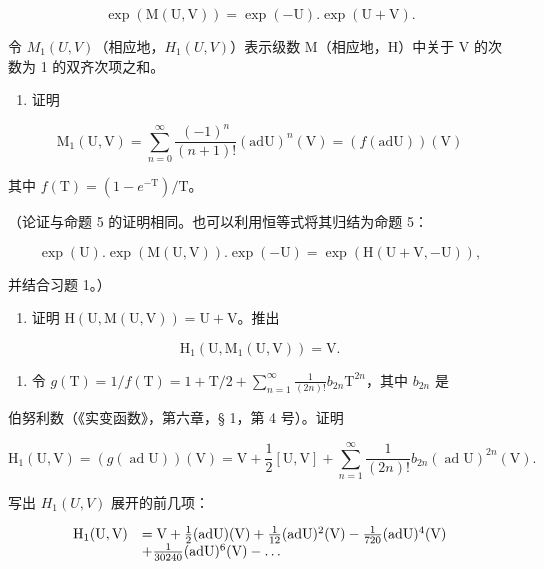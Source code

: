 \[
\exp (\mathrm{M} (\mathrm{U}, \mathrm{V})) = \exp (- \mathrm{U}). \exp (\mathrm{U} + \mathrm{V}).
\]

令 \(M_{1}(U, V)\)（相应地，\(H_{1}(U, V)\)）表示级数 M（相应地，H）中关于 V 的次数为 1 的双齐次项之和。

\begin{enumerate}
\def\labelenumi{(\alph{enumi})}
\tightlist
\item
  证明
\end{enumerate}

\[
\mathrm{M} _ {1} (\mathrm{U}, \mathrm{V}) = \sum_ {n = 0} ^ {\infty} \frac {(- 1) ^ {n}}{(n + 1) !} (\mathrm{adU}) ^ {n} (\mathrm{V}) = (f (\mathrm{adU})) (\mathrm{V})
\]

其中 \(f(\mathrm{T}) = (1 - e^{-\mathrm{T}}) / \mathrm{T}\)。

（论证与命题 5 的证明相同。也可以利用恒等式将其归结为命题 5：

\[
\exp (\mathrm{U}). \exp (\mathrm{M} (\mathrm{U}, \mathrm{V})). \exp (- \mathrm{U}) = \exp (\mathrm{H} (\mathrm{U} + \mathrm{V}, - \mathrm{U})),
\]

并结合习题 1。）

\begin{enumerate}
\def\labelenumi{(\alph{enumi})}
\setcounter{enumi}{1}
\tightlist
\item
  证明 \(\mathrm{H}(\mathrm{U},\mathrm{M}(\mathrm{U},\mathrm{V})) = \mathrm{U} + \mathrm{V}\)。推出
\end{enumerate}

\[
\mathrm{H} _ {1} (\mathrm{U}, \mathrm{M} _ {1} (\mathrm{U}, \mathrm{V})) = \mathrm{V}.
\]

\begin{enumerate}
\def\labelenumi{(\alph{enumi})}
\setcounter{enumi}{2}
\tightlist
\item
  令 \(g(\mathrm{T}) = 1 / f(\mathrm{T}) = 1 + \mathrm{T} / 2 + \sum_{n=1}^{\infty} \frac{1}{(2n)!} b_{2n}\mathrm{T}^{2n}\)，其中 \(b_{2n}\) 是
\end{enumerate}

伯努利数（《实变函数》，第六章，§ 1，第 4 号）。证明

\[
\mathrm{H} _ {1} (\mathrm{U}, \mathrm{V}) = (g (\operatorname{ad} \mathrm{U})) (\mathrm{V}) = \mathrm{V} + \frac {1}{2} [ \mathrm{U}, \mathrm{V} ] + \sum_ {n = 1} ^ {\infty} \frac {1}{(2 n) !} b _ {2 n} (\operatorname{ad} \mathrm{U}) ^ {2 n} (\mathrm{V}).
\]

写出 \(H_{1}(U, V)\) 展开的前几项：

\[
\begin{array}{r l} \mathrm{H} _ {1} (\mathrm{U}, \mathrm{V}) & = \mathrm{V} + \frac {1}{2} (\mathrm{adU}) (\mathrm{V}) + \frac {1}{12} (\mathrm{adU}) ^ {2} (\mathrm{V}) - \frac {1}{720} (\mathrm{adU}) ^ {4} (\mathrm{V}) \\ & + \frac {1}{30240} (\mathrm{adU}) ^ {6} (\mathrm{V}) - \dots \end{array}
\]

